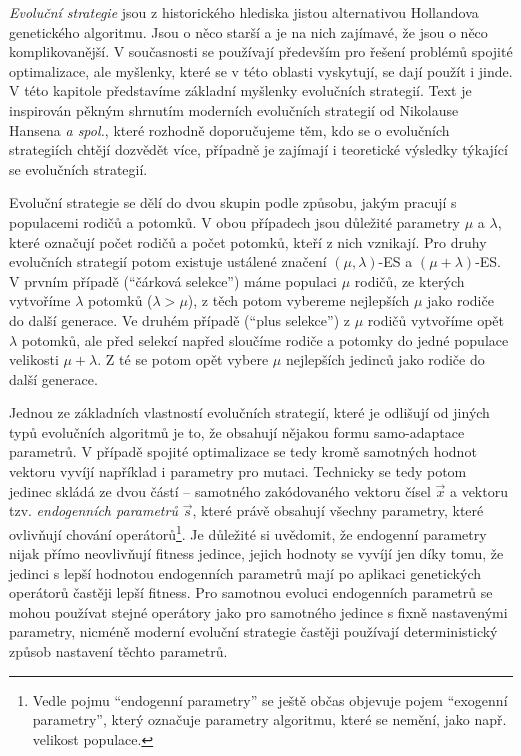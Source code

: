 
\emph{Evoluční strategie}\cite{rechenberg1973,schwefel1977numerische} jsou z historického hlediska jistou alternativou Hollandova genetického algoritmu. Jsou o něco starší a je na nich zajímavé, že jsou o něco komplikovanější. V současnosti se používají především pro řešení problémů spojité optimalizace, ale myšlenky, které se v této oblasti vyskytují, se dají použít i jinde. V této kapitole představíme základní myšlenky evolučních strategií. Text je inspirován pěkným shrnutím moderních evolučních strategií od Nikolause Hansena \emph{a spol.}\cite{hansen2015evolution}, které rozhodně doporučujeme těm, kdo se o evolučních strategiích chtějí dozvědět více, případně je zajímají i teoretické výsledky týkající se evolučních strategií.

Evoluční strategie se dělí do dvou skupin podle způsobu, jakým pracují s populacemi rodičů a potomků. V obou případech jsou důležité parametry $\mu$ a $\lambda$, které označují počet rodičů a počet potomků, kteří z nich vznikají. Pro druhy evolučních strategií potom existuje ustálené značení $(\mu, \lambda)$-ES a $(\mu + \lambda)$-ES. V prvním případě (``čárková selekce'') máme populaci $\mu$ rodičů, ze kterých vytvoříme $\lambda$ potomků ($\lambda > \mu$), z těch potom vybereme nejlepších $\mu$ jako rodiče do další generace.  Ve druhém případě (``plus selekce'') z $\mu$ rodičů vytvoříme opět $\lambda$ potomků, ale před selekcí napřed sloučíme rodiče a potomky do jedné populace velikosti $\mu + \lambda$. Z té se potom opět vybere $\mu$ nejlepších jedinců jako rodiče do další generace. 

Jednou ze základních vlastností evolučních strategií, které je odlišují od jiných typů evolučních algoritmů je to, že obsahují nějakou formu samo-adaptace parametrů. V případě spojité optimalizace se tedy kromě samotných hodnot vektoru vyvíjí například i parametry pro mutaci. Technicky se tedy potom jedinec skládá ze dvou částí -- samotného zakódovaného vektoru čísel $\vec{x}$ a vektoru tzv. \emph{endogenních parametrů} $\vec{s}$, které právě obsahují všechny parametry, které ovlivňují chování operátorů\footnote{Vedle pojmu ``endogenní parametry'' se ještě občas objevuje pojem ``exogenní parametry'', který označuje parametry algoritmu, které se nemění, jako např. velikost populace.}. Je důležité si uvědomit, že endogenní parametry nijak přímo neovlivňují fitness jedince, jejich hodnoty se vyvíjí jen díky tomu, že jedinci s lepší hodnotou endogenních parametrů mají po aplikaci genetických operátorů častěji lepší fitness. Pro samotnou evoluci endogenních parametrů se mohou používat stejné operátory jako pro samotného jedince s fixně nastavenými parametry, nicméně moderní evoluční strategie častěji používají deterministický způsob nastavení těchto parametrů.

